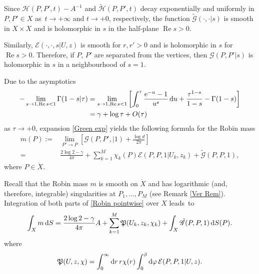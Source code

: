 \documentclass[pdftex]{sigma}
\numberwithin{equation}{section}
\theoremstyle{definition}
\begin{document}
Since $\mathscr{H}(P,P',t)-A^{-1}$ and $\tilde{\mathscr{H}}(P,P',t)$ decay exponentially and uniformly in $P,P'\in X$ as~${t\to +\infty}$ and $t\to +0$, respectively, the function $\tilde{\mathscr{G}}(\cdot,\cdot|s)$ is smooth in $X\times X$ and is holomorphic in $s$ in the half-plane $\operatorname{Re} s>0$.

Similarly, $\mathcal{E}(\cdot,\cdot,s|U,z)$ is smooth for $r,r'>0$ and is holomorphic in $s$ for $\operatorname{Re} s>0$. Therefore, if $P$, $P'$ are separated from the vertices, then $\mathscr{G}(P,P'|s)$ is holomorphic in $s$ in a neighbourhood of $s=1$.

Due to the asymptotics
\begin{align*}
-\lim_{s\to 1, \operatorname{Re} s<1}\Gamma(1-s|\tau)&=\lim_{s\to 1, \operatorname{Re} s<1}\left[\int_{0}^{\tau}\frac{{\rm e}^{-u}-1}{u^{s}}\, {\rm d}u+\frac{\tau^{1-s}}{1-s}-\Gamma(1-s)\right]\\
&=\gamma+\log \tau+O(\tau)
\end{align*}
as $\tau\to +0$, expansion \eqref{Green exp} yields the following formula for the Robin mass
\begin{align}
m(P):={}&\lim_{P'\to P}\left[\mathscr{G}(P,P',|1)+\frac{\log d}{2\pi}\right]\nonumber\\
={}&\frac{2\log 2-\gamma}{4\pi}
+\sum_{k=1}^M\chi_k(P)\mathcal{E}(P,P,1|U_k,z_k)+\tilde{\mathscr{G}}(P,P,1),\label{Robin pointwise}
\end{align}
where $P\in\dot{X}$.

Recall that the Robin mass $m$ is smooth on $\dot{X}$ and has logarithmic (and, therefore, integrable) singularities at $P_1,\dots,P_M$ (see Remark \ref{Ver Rem}). Integration of both parts of \eqref{Robin pointwise} over $X$ leads~to
\begin{gather}\label{Robin int 1}
\int_{X}m\, {\rm d }S=\frac{2\log 2-\gamma}{4\pi}A+\sum_{k=1}^M\mathfrak{P}(U_k,z_k,\chi_k)+\int_{X}\tilde{\mathscr{G}}(P,P,1)\, {\rm d }S(P).
\end{gather}
where
\[\mathfrak{P}(U,z,\chi)=\int_0^{\infty}{\rm d}r\, r\chi(r)\int_0^{\beta}{\rm d}\varphi\, \mathcal{E}(P,P,1|U,z).\]
\end{document}
